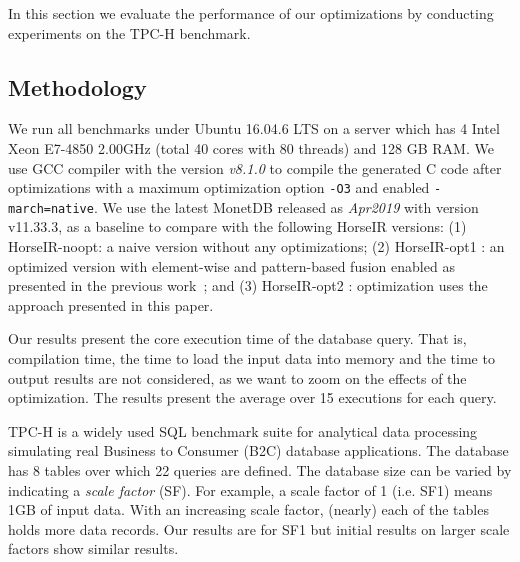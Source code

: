 In this section we evaluate the performance of our optimizations by conducting
experiments on the TPC-H benchmark. 

\subsection{Methodology}

We run all benchmarks under Ubuntu 16.04.6 LTS on a server which has 4 Intel
Xeon E7-4850 2.00GHz (total 40 cores with 80 threads) and 128 GB RAM.
We use GCC compiler with the version \textit{v8.1.0} to compile the generated C
code after optimizations with a maximum optimization option \texttt{-O3} and
enabled \texttt{-march=native}.
We use the latest MonetDB \cite{IdreosS2012} released as \textit{Apr2019} with
version v11.33.3, as a baseline to compare with the following HorseIR versions:
(1) HorseIR-noopt: a naive version without any optimizations;
(2) HorseIR-opt1 : an optimized version with element-wise and pattern-based
fusion enabled as presented in the previous work~\OldPaper; and
(3) HorseIR-opt2 : optimization uses the approach presented in this paper.

Our results present the core execution time of the database query. That is,
compilation time, the time to load the input data into memory and the time to
output results are not considered, as we want to zoom on the effects of the
optimization.  The results present the average over 15 executions for each
query.


TPC-H \cite{TPCH2017} is a widely used SQL benchmark suite for analytical data
processing simulating real Business to Consumer (B2C)
database applications. The database has 8 tables over which 22 queries are
defined.  The database size can be varied by indicating a  \textit{scale factor} (SF).
For example, a scale factor of 1 (i.e. SF1) means 1GB of input
data. With an increasing scale factor, (nearly) each of the tables holds more
data records. Our results are for SF1 but initial results on larger scale
factors show similar results.



